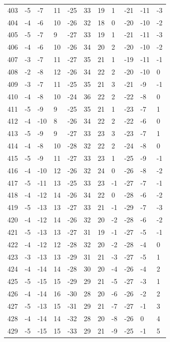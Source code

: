 \begin{table}[H]
\begin{tabular}{lllllllllll}
403 & -5 & -7 & 11 & -25 & 33 & 19 & 1 & -21 & -11 & -3 \\
404 & -4 & -6 & 10 & -26 & 32 & 18 & 0 & -20 & -10 & -2 \\
405 & -5 & -7 & 9 & -27 & 33 & 19 & 1 & -21 & -11 & -3 \\
406 & -4 & -6 & 10 & -26 & 34 & 20 & 2 & -20 & -10 & -2 \\
407 & -3 & -7 & 11 & -27 & 35 & 21 & 1 & -19 & -11 & -1 \\
408 & -2 & -8 & 12 & -26 & 34 & 22 & 2 & -20 & -10 & 0 \\
409 & -3 & -7 & 11 & -25 & 35 & 21 & 3 & -21 & -9 & -1 \\
410 & -4 & -8 & 10 & -24 & 36 & 22 & 2 & -22 & -8 & 0 \\
411 & -5 & -9 & 9 & -25 & 35 & 21 & 1 & -23 & -7 & 1 \\
412 & -4 & -10 & 8 & -26 & 34 & 22 & 2 & -22 & -6 & 0 \\
413 & -5 & -9 & 9 & -27 & 33 & 23 & 3 & -23 & -7 & 1 \\
414 & -4 & -8 & 10 & -28 & 32 & 22 & 2 & -24 & -8 & 0 \\
415 & -5 & -9 & 11 & -27 & 33 & 23 & 1 & -25 & -9 & -1 \\
416 & -4 & -10 & 12 & -26 & 32 & 24 & 0 & -26 & -8 & -2 \\
417 & -5 & -11 & 13 & -25 & 33 & 23 & -1 & -27 & -7 & -1 \\
418 & -4 & -12 & 14 & -26 & 34 & 22 & 0 & -28 & -6 & -2 \\
419 & -5 & -13 & 13 & -27 & 33 & 21 & -1 & -29 & -7 & -3 \\
420 & -4 & -12 & 14 & -26 & 32 & 20 & -2 & -28 & -6 & -2 \\
421 & -5 & -13 & 13 & -27 & 31 & 19 & -1 & -27 & -5 & -1 \\
422 & -4 & -12 & 12 & -28 & 32 & 20 & -2 & -28 & -4 & 0 \\
423 & -3 & -13 & 13 & -29 & 31 & 21 & -3 & -27 & -5 & 1 \\
424 & -4 & -14 & 14 & -28 & 30 & 20 & -4 & -26 & -4 & 2 \\
425 & -5 & -15 & 15 & -29 & 29 & 21 & -5 & -27 & -3 & 1 \\
426 & -4 & -14 & 16 & -30 & 28 & 20 & -6 & -26 & -2 & 2 \\
427 & -5 & -13 & 15 & -31 & 29 & 21 & -7 & -27 & -1 & 3 \\
428 & -4 & -14 & 14 & -32 & 28 & 20 & -8 & -26 & 0 & 4 \\
429 & -5 & -15 & 15 & -33 & 29 & 21 & -9 & -25 & -1 & 5 \\

\end{tabular}
\end{table}
